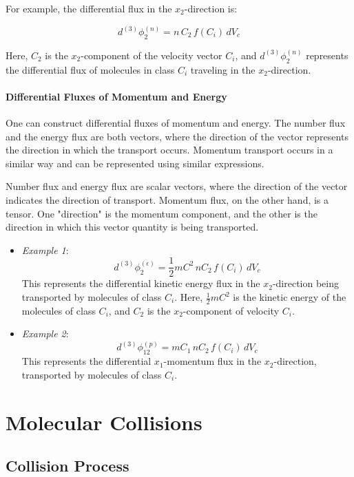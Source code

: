 \documentclass{article}
\begin{document}
For example, the differential flux in the \( x_2 \)-direction is:

\[
d^{(3)}\phi_2^{(n)} = n \, C_2 \, f(C_i) \, dV_c
\]

Here, \( C_2 \) is the \( x_2 \)-component of the velocity vector \( C_i \), and \( d^{(3)}\phi_2^{(n)} \) represents the differential flux of molecules in class \( C_i \) traveling in the \( x_2 \)-direction.

\paragraph{Differential Fluxes of Momentum and Energy} One can construct differential fluxes of momentum and energy. The number flux and the energy flux are both vectors, where the direction of the vector represents the direction in which the transport occurs. Momentum transport occurs in a similar way and can be represented using similar expressions.

Number flux and energy flux are scalar vectors, where the direction of the vector indicates the direction of transport. Momentum flux, on the other hand, is a tensor. One "direction" is the momentum component, and the other is the direction in which this vector quantity is being transported.

\begin{itemize}
    \item \emph{Example 1}:
    \[
    d^{(3)}\phi_2^{(\epsilon)} = \frac{1}{2} m C^2 \, n C_2 \, f(C_i) \, dV_c
    \]
    This represents the differential kinetic energy flux in the \( x_2 \)-direction being transported by molecules of class \( C_i \). Here, \( \frac{1}{2} m C^2 \) is the kinetic energy of the molecules of class \( C_i \), and \( C_2 \) is the \( x_2 \)-component of velocity \( C_i \).
    
    \item \emph{Example 2}:
    \[
    d^{(3)}\phi_{12}^{(p)} = m C_1 \, n C_2 \, f(C_i) \, dV_c
    \]
    This represents the differential \( x_1 \)-momentum flux in the \( x_2 \)-direction, transported by molecules of class \( C_i \).
\end{itemize}

\section{Molecular Collisions}

\subsection{Collision Process}
\end{document}
